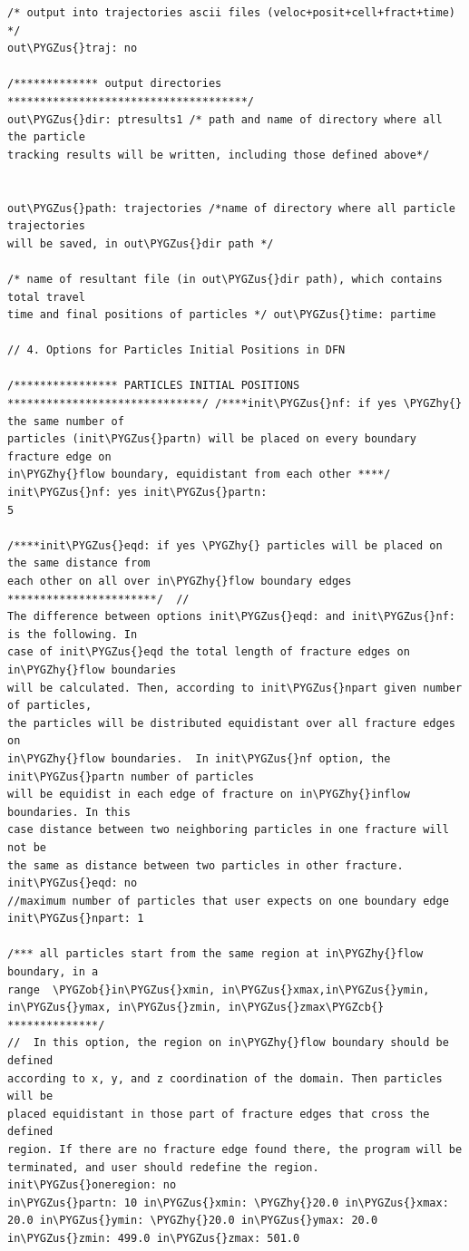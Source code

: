 \documentclass[letterpaper,10pt,english]{sphinxmanual}
\def\PYGZus{\char`\_}
\def\PYGZob{\char`\{}
\def\PYGZcb{\char`\}}
\def\PYGZhy{\char`\-}
\begin{document}
\begin{Verbatim}[commandchars=\\\{\}]
/* output into trajectories ascii files (veloc+posit+cell+fract+time) */
out\PYGZus{}traj: no

/************* output directories *************************************/
out\PYGZus{}dir: ptresults1 /* path and name of directory where all the particle
tracking results will be written, including those defined above*/


out\PYGZus{}path: trajectories /*name of directory where all particle trajectories
will be saved, in out\PYGZus{}dir path */

/* name of resultant file (in out\PYGZus{}dir path), which contains total travel
time and final positions of particles */ out\PYGZus{}time: partime

// 4. Options for Particles Initial Positions in DFN

/**************** PARTICLES INITIAL POSITIONS
******************************/ /****init\PYGZus{}nf: if yes \PYGZhy{} the same number of
particles (init\PYGZus{}partn) will be placed on every boundary fracture edge on
in\PYGZhy{}flow boundary, equidistant from each other ****/ init\PYGZus{}nf: yes init\PYGZus{}partn:
5

/****init\PYGZus{}eqd: if yes \PYGZhy{} particles will be placed on the same distance from
each other on all over in\PYGZhy{}flow boundary edges ***********************/  //
The difference between options init\PYGZus{}eqd: and init\PYGZus{}nf: is the following. In
case of init\PYGZus{}eqd the total length of fracture edges on in\PYGZhy{}flow boundaries
will be calculated. Then, according to init\PYGZus{}npart given number of particles,
the particles will be distributed equidistant over all fracture edges on
in\PYGZhy{}flow boundaries.  In init\PYGZus{}nf option, the init\PYGZus{}partn number of particles
will be equidist in each edge of fracture on in\PYGZhy{}inflow boundaries. In this
case distance between two neighboring particles in one fracture will not be
the same as distance between two particles in other fracture.   init\PYGZus{}eqd: no
//maximum number of particles that user expects on one boundary edge
init\PYGZus{}npart: 1

/*** all particles start from the same region at in\PYGZhy{}flow boundary, in a
range  \PYGZob{}in\PYGZus{}xmin, in\PYGZus{}xmax,in\PYGZus{}ymin, in\PYGZus{}ymax, in\PYGZus{}zmin, in\PYGZus{}zmax\PYGZcb{} **************/
//  In this option, the region on in\PYGZhy{}flow boundary should be defined
according to x, y, and z coordination of the domain. Then particles will be
placed equidistant in those part of fracture edges that cross the defined
region. If there are no fracture edge found there, the program will be
terminated, and user should redefine the region.  init\PYGZus{}oneregion: no
in\PYGZus{}partn: 10 in\PYGZus{}xmin: \PYGZhy{}20.0 in\PYGZus{}xmax: 20.0 in\PYGZus{}ymin: \PYGZhy{}20.0 in\PYGZus{}ymax: 20.0
in\PYGZus{}zmin: 499.0 in\PYGZus{}zmax: 501.0


\end{Verbatim}
\end{document}
